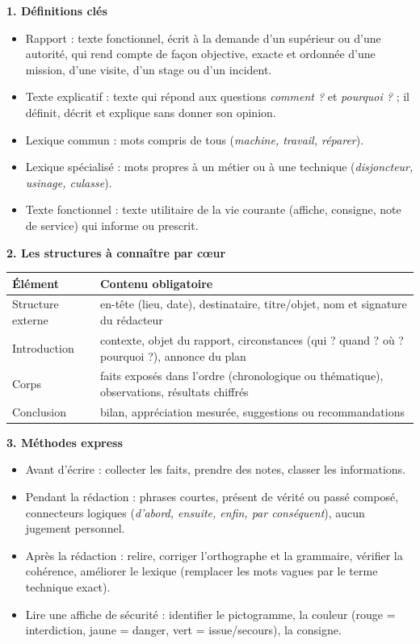 \documentclass[11pt]{article}
\newcommand{\cle}[1]{{\popxbold\color{popdark}#1}}
\begin{document}
\begin{bilan}
\textbf{1. D\'efinitions cl\'es}
\begin{itemize}
  \item \cle{Rapport} : texte fonctionnel, \'ecrit \`a la demande d'un sup\'erieur ou d'une autorit\'e, qui rend compte de fa\c{c}on \cle{objective}, exacte et ordonn\'ee d'une mission, d'une visite, d'un stage ou d'un incident.
  \item \cle{Texte explicatif} : texte qui r\'epond aux questions \emph{comment ?} et \emph{pourquoi ?} ; il d\'efinit, d\'ecrit et explique sans donner son opinion.
  \item \cle{Lexique commun} : mots compris de tous (\emph{machine, travail, r\'eparer}).
  \item \cle{Lexique sp\'ecialis\'e} : mots propres \`a un m\'etier ou \`a une technique (\emph{disjoncteur, usinage, culasse}).
  \item \cle{Texte fonctionnel} : texte utilitaire de la vie courante (affiche, consigne, note de service) qui informe ou prescrit.
\end{itemize}

\textbf{2. Les structures \`a conna\^itre par c\oe ur}
\begin{center}
\begin{tabularx}{\linewidth}{|l|X|}
\hline
\rowcolor{popblueL} \textbf{\'El\'ement} & \textbf{Contenu obligatoire} \\
\hline
Structure externe & en-t\^ete (lieu, date), destinataire, titre/objet, nom et signature du r\'edacteur \\
\hline
Introduction & contexte, objet du rapport, circonstances (qui ? quand ? o\`u ? pourquoi ?), annonce du plan \\
\hline
Corps & faits expos\'es dans l'ordre (chronologique ou th\'ematique), observations, r\'esultats chiffr\'es \\
\hline
Conclusion & bilan, appr\'eciation mesur\'ee, suggestions ou recommandations \\
\hline
\end{tabularx}
\end{center}

\textbf{3. M\'ethodes express}
\begin{itemize}
  \item Avant d'\'ecrire : collecter les faits, prendre des notes, classer les informations.
  \item Pendant la r\'edaction : phrases courtes, pr\'esent de v\'erit\'e ou pass\'e compos\'e, connecteurs logiques (\emph{d'abord, ensuite, enfin, par cons\'equent}), aucun jugement personnel.
  \item Apr\`es la r\'edaction : relire, corriger l'orthographe et la grammaire, v\'erifier la coh\'erence, am\'eliorer le lexique (remplacer les mots vagues par le terme technique exact).
  \item Lire une affiche de s\'ecurit\'e : identifier le pictogramme, la couleur (rouge = interdiction, jaune = danger, vert = issue/secours), la consigne.
\end{itemize}
\end{bilan}
\end{document}

